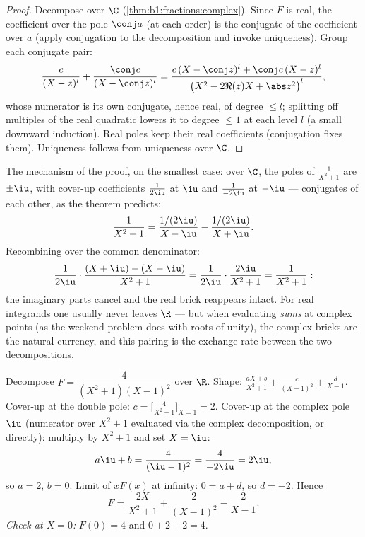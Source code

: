\begin{proof}
Decompose over $\C$ (\cref{thm:b1:fractions:complex}). Since $F$ is
real, the coefficient over the pole $\conj a$ (at each order) is the
conjugate of the coefficient over $a$ (apply conjugation to the
decomposition and invoke uniqueness). Group each conjugate pair:
\[
\frac{c}{(X - z)^l} + \frac{\conj c}{(X - \conj z)^l}
= \frac{c\,(X - \conj z)^l + \conj c\,(X - z)^l}{\bigl(X^2 - 2\Re(z)X
+ \abs z^2\bigr)^{l}},
\]
whose numerator is its own conjugate, hence real, of degree $\leq l$;
splitting off multiples of the real quadratic lowers it to degree
$\leq 1$ at each level $l$ (a small downward induction). Real poles
keep their real coefficients (conjugation fixes them). Uniqueness
follows from uniqueness over $\C$.
\end{proof}

\begin{example}\label{ex:b1:fractions:pairing}
The mechanism of the proof, on the smallest case: over $\C$, the
poles of $\frac1{X^2+1}$ are $\pm\iu$, with cover-up coefficients
$\frac1{2\iu}$ at $\iu$ and $\frac1{-2\iu}$ at $-\iu$ ---
conjugates of each other, as the theorem predicts:
\[
\frac{1}{X^2 + 1}
= \frac{1/(2\iu)}{X - \iu} - \frac{1/(2\iu)}{X + \iu} .
\]
Recombining over the common denominator:
\[
\frac{1}{2\iu}\cdot\frac{(X + \iu) - (X - \iu)}{X^2 + 1}
= \frac{1}{2\iu}\cdot\frac{2\iu}{X^2 + 1} = \frac{1}{X^2+1} :
\]
the imaginary parts cancel and the real brick reappears intact.
For real integrands one usually never leaves $\R$ --- but when
evaluating \emph{sums} at complex points (as the weekend problem
does with roots of unity), the complex bricks are the natural
currency, and this pairing is the exchange rate between the two
decompositions.
\end{example}

\begin{example}\label{ex:b1:fractions:real}
Decompose $F = \dfrac{4}{(X^2+1)(X-1)^2}$ over $\R$. Shape:
$\frac{aX + b}{X^2 + 1} + \frac{c}{(X-1)^2} + \frac{d}{X - 1}$.
Cover-up at the double pole: $c = \bigl[\frac{4}{X^2+1}\bigr]_{X=1} =
2$. Cover-up at the complex pole $\iu$ (numerator over $X^2 + 1$
evaluated via the complex decomposition, or directly): multiply by
$X^2 + 1$ and set $X = \iu$:
\[
a\iu + b = \frac{4}{(\iu - 1)^2} = \frac{4}{-2\iu} = 2\iu ,
\]
so $a = 2$, $b = 0$. Limit of $xF(x)$ at infinity: $0 = a + d$, so $d
= -2$. Hence
\[
F = \frac{2X}{X^2+1} + \frac{2}{(X-1)^2} - \frac{2}{X-1} .
\]
\emph{Check at $X = 0$:} $F(0) = 4$ and $0 + 2 + 2 = 4$.
\end{example}


